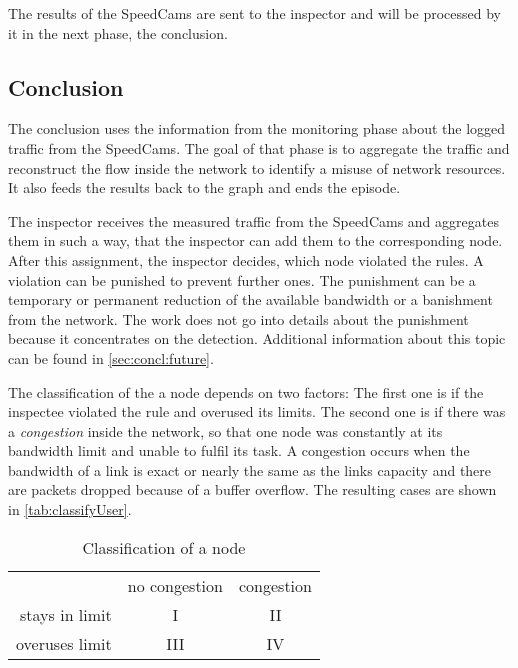 \documentclass[thesis.tex]{subfiles}
\begin{document}
The results of the SpeedCams are sent to the inspector and will be processed by it in the next phase, the conclusion.

\subsection{Conclusion} \label{sec:main:conclusionphase}
The conclusion uses the information from the monitoring phase about the logged traffic from the SpeedCams. The goal of that phase is to aggregate the traffic and reconstruct the flow inside the network to identify a misuse of network resources. It also feeds the results back to the graph and ends the episode.

The inspector receives the measured traffic from the SpeedCams and aggregates them in such a way, that the inspector can add them to the corresponding node. After this assignment, the inspector decides, which node violated the rules. A violation can be punished to prevent further ones. The punishment can be a temporary or permanent reduction of the available bandwidth or a banishment from the network. The work does not go into details about the punishment because it concentrates on the detection. Additional information about this topic can be found in \autoref{sec:concl:future}.

The classification of the a node depends on two factors: The first one is if the inspectee violated the rule and overused its limits. The second one is if there was a \textit{congestion} inside the network, so that one node was constantly at its bandwidth limit and unable to fulfil its task. A congestion occurs when the bandwidth of a link is exact or nearly the same as the links capacity and there are packets dropped because of a buffer overflow. The resulting cases are shown in \autoref{tab:classifyUser}.

\begin{table}[h]
    \centering
    \begin{tabular}{ r|c|c| }
        \multicolumn{1}{r}{}
        &  \multicolumn{1}{c}{no congestion}
        & \multicolumn{1}{c}{congestion} \\
        \cline{2-3}
        stays in limit & I & II \\
        \cline{2-3}
        overuses limit & III & IV \\
        \cline{2-3}
    \end{tabular}
    \caption{Classification of a node}
    \label{tab:classifyUser}    
\end{table}
\end{document}
